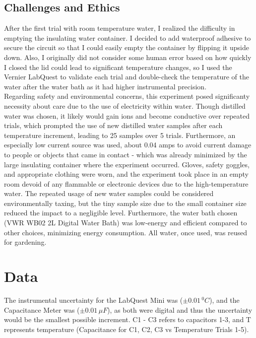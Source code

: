 \documentclass[12pt]{article}
\numberwithin{equation}{section}
\begin{document}
\subsection{Challenges and Ethics}
After the first trial with room temperature water, I realized the difficulty in emptying the insulating water container. I decided to add waterproof adhesive to secure the circuit so that I could easily empty the container by flipping it upside down. Also, I originally did not consider some human error based on how quickly I closed the lid could lead to significant temperature changes, so I used the Vernier LabQuest to validate each trial and double-check the temperature of the water after the water bath as it had higher instrumental precision. 
\\
\noindent Regarding safety and environmental concerns, this experiment posed significanty necessity about care due to the use of electricity within water. Though distilled water was chosen, it likely would gain ions and become conductive over repeated trials, which prompted the use of new distilled water samples after each temperature increment, leading to 25 samples over 5 trials. Furthermore, an especially low current source was used, about 0.04 amps to avoid current damage to people or objects that came in contact - which was already minimized by the large insulating container where the experiment occurred. Gloves, safety goggles, and appropriate clothing were worn, and the experiment took place in an empty room devoid of any flammable or electronic devices due to the high-temperature water. The repeated usage of new water samples could be considered environmentally taxing, but the tiny sample size due to the small container size reduced the impact to a negligible level. Furthermore, the water bath chosen (VWR WB02 2L Digital Water Bath) was low-energy and efficient compared to other choices, minimizing energy consumption. All water, once used, was reused for gardening.

\section{Data}
The instrumental uncertainty for the LabQuest Mini was ($\pm 0.01 \, ^0 C$), and the Capacitance Meter was ($\pm 0.01 \, \mu F$), as both were digital and thus the uncertainty would be the smallest possible increment. C1 - C3 refers to capacitors 1-3, and T represents temperature (Capacitance for C1, C2, C3 vs Temperature Trials 1-5).
\end{document}
